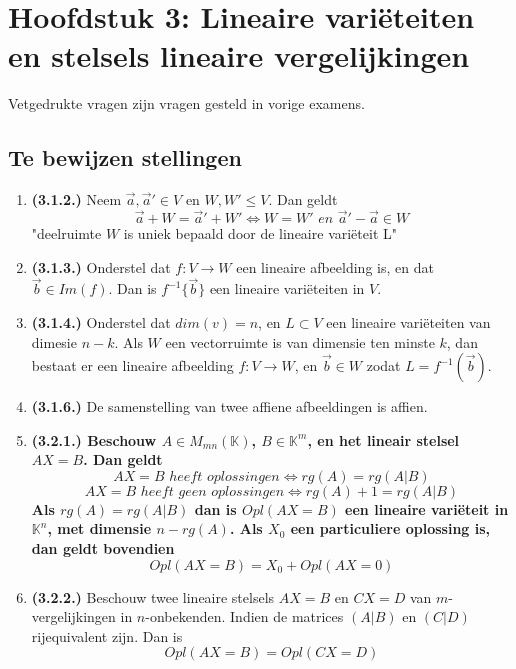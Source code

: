 \documentclass[12pt]{article}
\begin{document}
\date{}    
\maketitle
    \section*{Hoofdstuk 3: Lineaire variëteiten en stelsels lineaire vergelijkingen}
    Vetgedrukte vragen zijn vragen gesteld in vorige examens.
    \setcounter{section}{3}
    \subsection*{Te bewijzen stellingen}
    \begin{enumerate}
        \item \textbf{(3.1.2.)} Neem $\vec{a},\vec{a}' \in V$ en $W,W' \leq V$. Dan geldt $$\vec{a}+W=\vec{a}'+W' \Leftrightarrow W=W' \,\, en \,\, \vec{a}'-\vec{a}\in W$$ "deelruimte $W$ is uniek bepaald door de lineaire variëteit L"
        \item \textbf{(3.1.3.)} Onderstel dat $f:V \rightarrow W$ een lineaire afbeelding is, en dat $\vec{b}\in Im(f)$. Dan is $f^{-1}\{\vec{b}\}$ een lineaire variëteiten in $V$.
        \item \textbf{(3.1.4.)} Onderstel dat $dim(v)=n$, en $L\subset V$ een lineaire variëteiten van dimesie $n-k$. Als $W$ een vectorruimte is van dimensie ten minste $k$, dan bestaat er een lineaire afbeelding $f:V\rightarrow W$, en $\vec{b}\in W$ zodat $L=f^{-1}(\vec{b})$.
        \item \textbf{(3.1.6.)} De samenstelling van twee affiene afbeeldingen is affien.
        \item \textbf{\textbf{(3.2.1.)} Beschouw $A\in M_{mn}(\mathbb{K})$, $B\in \mathbb{K}^m$, en het lineair stelsel $AX=B$. Dan geldt $$AX=B \,\, heeft \,\, oplossingen \Leftrightarrow rg(A)=rg(A|B)$$ $$AX=B \,\, heeft \,\, geen \,\, oplossingen \Leftrightarrow rg(A)+1=rg(A|B)$$ Als $rg(A)=rg(A|B)$ dan is $Opl(AX=B)$ een lineaire variëteit in $\mathbb{K}^n$, met dimensie $n-rg(A)$. Als $X_0$ een particuliere oplossing is, dan geldt bovendien $$Opl(AX=B)=X_0+Opl(AX=0)$$}
        \item \textbf{(3.2.2.)} Beschouw twee lineaire stelsels $AX=B$ en $CX=D$ van $m$-vergelijkingen in $n$-onbekenden. Indien de matrices $(A|B)$ en $(C|D)$ rijequivalent zijn. Dan is $$Opl(AX=B)=Opl(CX=D)$$
    \end{enumerate}
\end{document}
